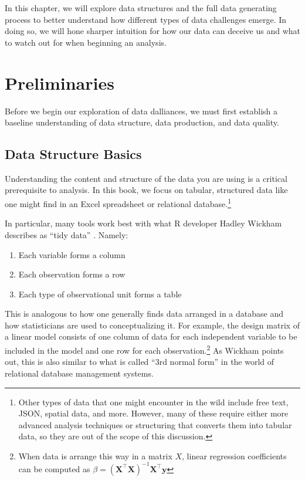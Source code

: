 \documentclass[
]{krantz}
\providecommand{\tightlist}{%
  \setlength{\itemsep}{0pt}\setlength{\parskip}{0pt}}
\begin{document}
In this chapter, we will explore data structures and the full data generating process to better understand how different types of data challenges emerge.
In doing so, we will hone sharper intuition for how our data can deceive us and what to watch out for when beginning an analysis.

\hypertarget{preliminaries}{%
\section{Preliminaries}\label{preliminaries}}

Before we begin our exploration of data dalliances, we must first establish a baseline understanding of data structure, data production, and data quality.

\hypertarget{data-structure-basics}{%
\subsection{Data Structure Basics}\label{data-structure-basics}}

Understanding the content and structure of the data you are using is a critical prerequisite to analysis.
In this book, we focus on tabular, structured data like one might find in an Excel spreadsheet or relational database.\footnote{Other types of data that one might encounter in the wild include free text, JSON, spatial data, and more. However, many of these require either more advanced analysis techniques or structuring that converts them into tabular data, so they are out of the scope of this discussion.}

In particular, many tools work best with what R developer Hadley Wickham describes as ``tidy data'' \citep{wickham_tidy}. Namely:

\begin{enumerate}
\def\labelenumi{\arabic{enumi}.}
\tightlist
\item
  Each variable forms a column
\item
  Each observation forms a row
\item
  Each type of observational unit forms a table
\end{enumerate}

This is analogous to how one generally finds data arranged in a database and how statisticians are used to conceptualizing it.
For example, the design matrix of a linear model consists of one column of data for each independent variable to be included in the model and one row for each observation.\footnote{When data is arrange this way in a matrix \(X\), linear regression coefficients can be computed as \(\beta = (\mathbf{X}^\intercal\mathbf{X})^{-1}\mathbf{X}^\intercal \mathbf{y}\)}
As Wickham points out, this is also similar to what is called ``3rd normal form'' in the world of relational database management systems.
\end{document}

